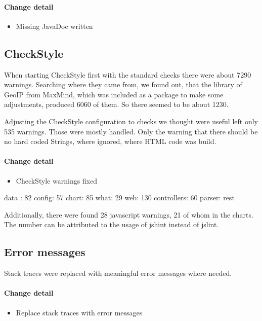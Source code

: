 \paragraph{Change detail}
\begin{itemize}
  \item Missing JavaDoc written
\end{itemize}

\subsection{CheckStyle}\label{cs} %
When starting CheckStyle first with the standard checks there were about 7290 warnings.
Searching where they came from, we found out, that the library of GeoIP from MaxMind, 
which was included as a package to make some adjustments, produced 6060 of them. So there seemed to be about
1230.

Adjusting the CheckStyle configuration to checks we thought were useful left only 535 warnings.
Those were mostly handled. Only the warning that there should be no hard coded Strings, where
ignored, where HTML code was build.

\paragraph{Change detail}
\begin{itemize}
  \item CheckStyle warnings fixed
\end{itemize}
data : 82
config: 57
chart: 85
what: 29
web: 130
controllers: 60 
parser: rest

Additionally, there were found 28 javascript warnings, 21 of whom in the charts.
The number can be attributed to the usage of jshint instead of jslint.

\subsection{Error messages}
Stack traces were replaced with meaningful error messages where needed.
\paragraph{Change detail}
\begin{itemize}
  \item Replace stack traces with error messages
\end{itemize}

 
